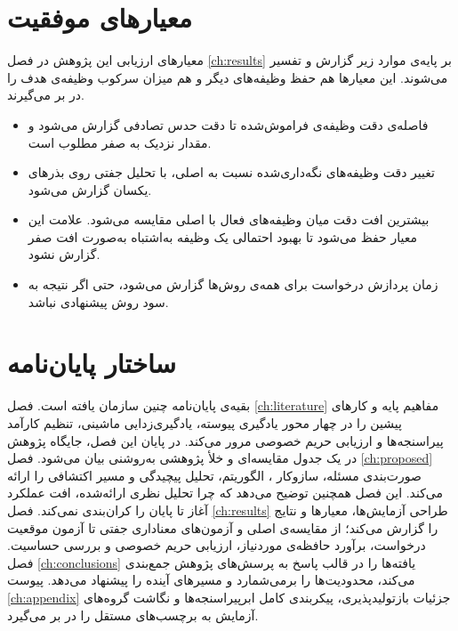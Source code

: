 \section{معیارهای موفقیت}
\label{sec:intro-success}

معیارهای ارزیابی این پژوهش در فصل \ref{ch:results} بر پایه‌ی موارد زیر گزارش و تفسیر می‌شوند. این معیارها هم حفظ وظیفه‌های دیگر و هم میزان سرکوب وظیفه‌ی هدف را در بر می‌گیرند.

\begin{itemize}
	\item فاصله‌ی دقت وظیفه‌ی فراموش‌شده تا دقت حدس تصادفی گزارش می‌شود و مقدار نزدیک به صفر مطلوب است.
	\item تغییر دقت وظیفه‌های نگه‌داری‌شده نسبت به  اصلی، با تحلیل جفتی روی بذرهای یکسان گزارش می‌شود.
	\item بیشترین افت دقت میان وظیفه‌های فعال با  اصلی مقایسه می‌شود. علامت این معیار حفظ می‌شود تا بهبود احتمالی یک وظیفه به‌اشتباه به‌صورت افت صفر گزارش نشود.
	\item زمان پردازش درخواست برای همه‌ی روش‌ها گزارش می‌شود، حتی اگر نتیجه به سود روش پیشنهادی نباشد.
\end{itemize}

\section{ساختار پایان‌نامه}
\label{sec:intro-structure}

بقیه‌ی پایان‌نامه چنین سازمان یافته است. فصل \ref{ch:literature} مفاهیم پایه و کارهای پیشین را در چهار محور یادگیری پیوسته، یادگیری‌زدایی ماشینی، تنظیم کارآمد پیراسنجه‌ها و ارزیابی حریم خصوصی مرور می‌کند. در پایان این فصل، جایگاه پژوهش در یک جدول مقایسه‌ای و خلأ پژوهشی به‌روشنی بیان می‌شود. فصل \ref{ch:proposed} صورت‌بندی مسئله، سازوکار ، الگوریتم، تحلیل پیچیدگی و مسیر اکتشافی  را ارائه می‌کند. این فصل همچنین توضیح می‌دهد که چرا تحلیل نظری ارائه‌شده، افت عملکرد آغاز تا پایان را کران‌بندی نمی‌کند. فصل \ref{ch:results} طراحی آزمایش‌ها، معیارها و نتایج را گزارش می‌کند؛ از مقایسه‌ی اصلی و آزمون‌های معناداری جفتی تا آزمون موقعیت درخواست، برآورد حافظه‌ی موردنیاز، ارزیابی حریم خصوصی و بررسی حساسیت. فصل \ref{ch:conclusions} یافته‌ها را در قالب پاسخ به پرسش‌های پژوهش جمع‌بندی می‌کند، محدودیت‌ها را برمی‌شمارد و مسیرهای آینده را پیشنهاد می‌دهد. پیوست \ref{ch:appendix} جزئیات بازتولیدپذیری، پیکربندی کامل ابرپیراسنجه‌ها و نگاشت گروه‌های آزمایش به برچسب‌های مستقل را در بر می‌گیرد.
